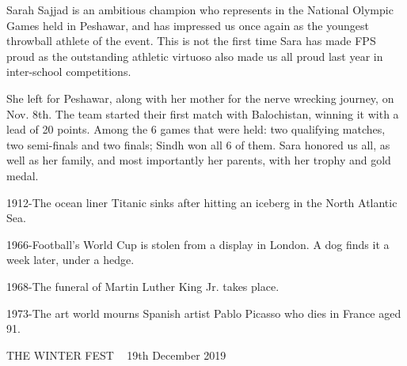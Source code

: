 \documentclass{article}
\begin{document}
\begin{multicols}{2}


Sarah Sajjad is an ambitious champion who represents in the National Olympic Games held in Peshawar, and has impressed us once again as the youngest throwball athlete of the event. This is not the first time Sara has made FPS proud as the outstanding athletic virtuoso also made us all proud last year in inter-school competitions. 

She left for Peshawar, along with her mother for the nerve wrecking journey, on Nov. 8th. The team started their first match with Balochistan, winning it with a lead of 20 points. Among the 6 games that were held: two qualifying matches, two semi-finals and two finals; Sindh won all 6 of them. Sara honored us all, as well as her family, and most importantly her parents, with her trophy and gold medal.  


\closearticle

1912-The ocean liner Titanic sinks after hitting an iceberg in the North Atlantic Sea.

1966-Football’s World Cup is stolen from a display in London. A dog finds it a week later, under a hedge.

1968-The funeral of Martin Luther King Jr. takes place.

1973-The art world mourns Spanish artist Pablo Picasso who dies in France aged 91.
\closearticle

THE WINTER FEST ~ 19th December 2019
\closearticle
\end{multicols}

\pagebreak


\end{document}
